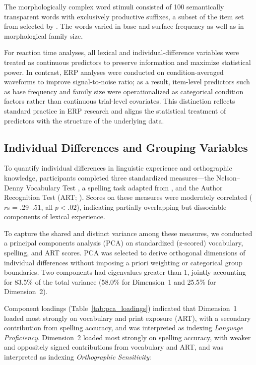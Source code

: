 \documentclass[utf8]{FrontiersinHarvard} %
\begin{document}
	The morphologically complex word stimuli consisted of 100 semantically transparent words with exclusively productive suffixes, a subset of the item set from \citet{fordDerivationalMorphologyBase2010} selected by \citet{sawiIndividualDifferencesSensitivity2016}. The words varied in base and surface frequency as well as in morphological family size.
	
	For reaction time analyses, all lexical and individual-difference variables were treated as continuous predictors to preserve information and maximize statistical power. In contrast, ERP analyses were conducted on condition-averaged waveforms to improve signal-to-noise ratio; as a result, item-level predictors such as base frequency and family size were operationalized as categorical condition factors rather than continuous trial-level covariates. This distinction reflects standard practice in ERP research and aligns the statistical treatment of predictors with the structure of the underlying data.
	
	\subsection{Individual Differences and Grouping Variables}
	
	To quantify individual differences in linguistic experience and orthographic knowledge, participants completed three standardized measures---the Nelson–Denny Vocabulary Test \citep{brownNelsonDennyReadingTest1993}, a spelling task adapted from \citet{sawiIndividualDifferencesSensitivity2016}, and the Author Recognition Test (ART; \citealt{stanovichExposurePrintOrthographic1989}). Scores on these measures were moderately correlated ($r$s = .29–.51, all $p < .02$), indicating partially overlapping but dissociable components of lexical experience.
	
	To capture the shared and distinct variance among these measures, we conducted a principal components analysis (PCA) on standardized (z-scored) vocabulary, spelling, and ART scores. PCA was selected to derive orthogonal dimensions of individual differences without imposing a priori weighting or categorical group boundaries. Two components had eigenvalues greater than 1, jointly accounting for 83.5\% of the total variance (58.0\% for Dimension~1 and 25.5\% for Dimension~2).
	
	Component loadings (Table~\ref{tab:pca_loadings}) indicated that Dimension~1 loaded most strongly on vocabulary and print exposure (ART), with a secondary contribution from spelling accuracy, and was interpreted as indexing \textit{Language Proficiency}. Dimension~2 loaded most strongly on spelling accuracy, with weaker and oppositely signed contributions from vocabulary and ART, and was interpreted as indexing \textit{Orthographic Sensitivity}:
	
\end{document}
